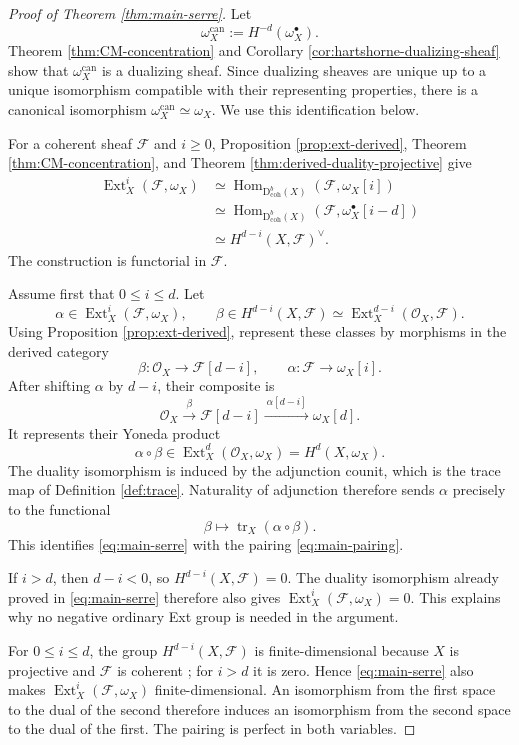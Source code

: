 \documentclass[11pt,a4paper]{article}
\theoremstyle{definition}
\theoremstyle{remark}
\newcommand{\OO}{\mathcal O}
\newcommand{\FF}{\mathcal F}
\newcommand{\Hom}{\operatorname{Hom}}
\newcommand{\Ext}{\operatorname{Ext}}
\newcommand{\Dbcoh}{\mathrm D^b_{\mathrm{coh}}}
\newcommand{\tr}{\operatorname{tr}}
\newcommand{\dual}{^{\vee}}
\begin{document}
\begin{proof}[Proof of Theorem \ref{thm:main-serre}]
Let
\[
  \omega_X^{\mathrm{can}}:=H^{-d}(\omega_X^\bullet).
\]
Theorem \ref{thm:CM-concentration} and Corollary
\ref{cor:hartshorne-dualizing-sheaf} show that
$\omega_X^{\mathrm{can}}$ is a dualizing sheaf. Since dualizing sheaves are
unique up to a unique isomorphism compatible with their representing
properties, there is a canonical isomorphism
$\omega_X^{\mathrm{can}}\simeq\omega_X$. We use this identification below.

For a coherent sheaf $\FF$ and $i\geq0$, Proposition
\ref{prop:ext-derived}, Theorem \ref{thm:CM-concentration}, and Theorem
\ref{thm:derived-duality-projective} give
\begin{align*}
  \Ext_X^i(\FF,\omega_X)
  &\simeq\Hom_{\Dbcoh(X)}(\FF,\omega_X[i])\\
  &\simeq\Hom_{\Dbcoh(X)}(\FF,\omega_X^\bullet[i-d])\\
  &\simeq H^{d-i}(X,\FF)\dual.
\end{align*}
The construction is functorial in $\FF$.

Assume first that $0\leq i\leq d$. Let
\[
  \alpha\in\Ext_X^i(\FF,\omega_X),
  \qquad
  \beta\in H^{d-i}(X,\FF)
  \simeq\Ext_X^{d-i}(\OO_X,\FF).
\]
Using Proposition \ref{prop:ext-derived}, represent these classes by
morphisms in the derived category
\[
  \beta:\OO_X\longrightarrow\FF[d-i],
  \qquad
  \alpha:\FF\longrightarrow\omega_X[i].
\]
After shifting $\alpha$ by $d-i$, their composite is
\[
  \OO_X\xrightarrow{\ \beta\ }\FF[d-i]
  \xrightarrow{\ \alpha[d-i]\ }\omega_X[d].
\]
It represents their Yoneda product
\[
  \alpha\circ\beta
  \in\Ext_X^d(\OO_X,\omega_X)=H^d(X,\omega_X).
\]
The duality isomorphism is induced by the adjunction counit, which is the
trace map of Definition \ref{def:trace}. Naturality of adjunction therefore sends
$\alpha$ precisely to the functional
\[
  \beta\longmapsto\tr_X(\alpha\circ\beta).
\]
This identifies \eqref{eq:main-serre} with the pairing
\eqref{eq:main-pairing}.

If $i>d$, then $d-i<0$, so $H^{d-i}(X,\FF)=0$. The duality isomorphism
already proved in \eqref{eq:main-serre} therefore also gives
$\Ext_X^i(\FF,\omega_X)=0$. This explains why no negative ordinary Ext group
is needed in the argument.

For $0\leq i\leq d$, the group $H^{d-i}(X,\FF)$ is finite-dimensional
because $X$ is projective and $\FF$ is coherent
\cite[Chapter III, Theorem 5.2]{HartshorneAG}; for $i>d$ it is zero. Hence
\eqref{eq:main-serre} also makes $\Ext_X^i(\FF,\omega_X)$ finite-dimensional.
An isomorphism from the first space to the dual of the second therefore
induces an isomorphism from the second space to the dual of the first. The
pairing is perfect in both variables.
\end{proof}
\end{document}

